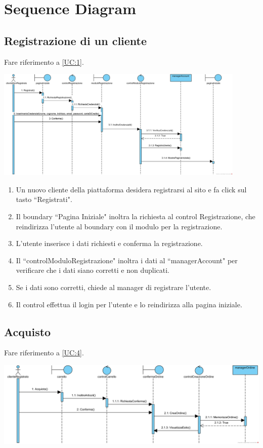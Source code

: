 \documentclass[12pt,a4paper]{article}
\begin{document}
\newpage
\section{Sequence Diagram}
\subsection{Registrazione di un cliente}

Fare riferimento a \ref{UC:1}.

\includegraphics[height=200px]{SequenceDiagram/Registrazione}

\begin{enumerate}
\item Un nuovo cliente della piattaforma desidera registrarsi al sito e fa click sul tasto ``Registrati".
\item Il boundary ``Pagina Iniziale" inoltra la richiesta al control Registrazione, che reindirizza l'utente al boundary con il modulo per la registrazione.
\item L'utente inserisce i dati richiesti e conferma la registrazione.
\item Il ``controlModuloRegistrazione" inoltra i dati al ``managerAccount" per verificare che i dati siano corretti e non duplicati.
\item Se i dati sono corretti, chiede al manager di registrare l'utente.
\item Il control effettua il login per l'utente e lo reindirizza alla pagina iniziale.
\end{enumerate}

\newpage

\subsection{Acquisto}

Fare riferimento a \ref{UC:4}.

\includegraphics[width=\textwidth]{SequenceDiagram/Acquisto}
\end{document}

